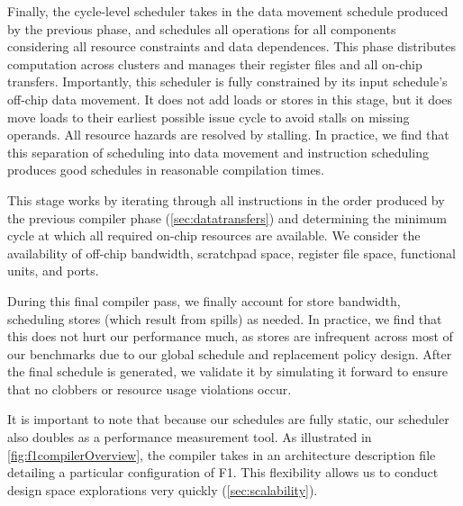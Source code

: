 Finally, the cycle-level scheduler takes in the data movement schedule produced by the previous phase,
and schedules all operations for all components considering all resource constraints and data dependences.
This phase distributes computation across clusters and manages their register files and all on-chip transfers.
Importantly, this scheduler is fully constrained by its input schedule's off-chip data movement. 
It does not add loads or stores in this stage, but it does move loads to
their earliest possible issue cycle to avoid stalls on missing operands.
All resource hazards are resolved by stalling.
In practice, we find that this separation of scheduling into data movement and instruction scheduling produces good schedules in reasonable compilation times.

This stage works by iterating through all instructions in the order produced by the previous compiler phase (\autoref{sec:datatransfers}) and determining the minimum cycle at which all required on-chip resources are available. We consider the availability of off-chip bandwidth, scratchpad space, register file space, functional units, and ports.


During this final compiler pass, we finally account for store bandwidth, scheduling stores (which result from spills) as needed. In practice, we find that this does not hurt our performance much, as stores are infrequent across most of our benchmarks due to our global schedule and replacement policy design. After the final schedule is generated, we validate it by simulating it forward to ensure that no clobbers or resource usage violations occur.

It is important to note that because our schedules are fully static, our scheduler also doubles as a performance measurement tool. As illustrated in \autoref{fig:f1compilerOverview}, the compiler takes in an architecture description file detailing a particular configuration of F1. This flexibility allows us to conduct design space explorations very quickly (\autoref{sec:scalability}).
